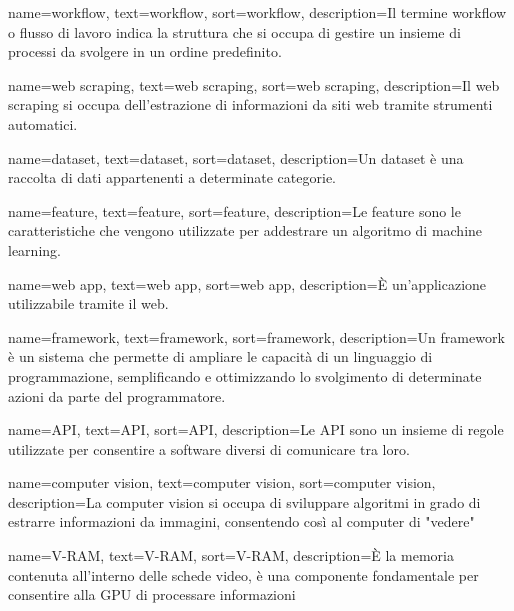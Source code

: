  {
    name=workflow,
    text=workflow,
    sort=workflow,
    description={Il termine workflow o flusso di lavoro indica la struttura che si occupa di gestire un insieme di processi da svolgere in un ordine predefinito.}
}

 {
    name=web scraping,
    text=web scraping,
    sort=web scraping,
    description={Il web scraping si occupa dell'estrazione di informazioni da siti web tramite strumenti automatici.}
}

 {
    name=dataset,
    text=dataset,
    sort=dataset,
    description={Un dataset è una raccolta di dati appartenenti a determinate categorie.}
}

 {
    name=feature,
    text=feature,
    sort=feature,
    description={Le feature sono le caratteristiche che vengono utilizzate per addestrare un algoritmo di machine learning.}
}

 {
    name=web app,
    text=web app,
    sort=web app,
    description={È un'applicazione utilizzabile tramite il web.}
}

 {
    name=framework,
    text=framework,
    sort=framework,
    description={Un framework è un sistema che permette di ampliare le capacità di un linguaggio di programmazione, semplificando e ottimizzando lo svolgimento di determinate azioni da parte del programmatore.}
}

 {
    name=API,
    text=API,
    sort=API,
    description={Le API sono un insieme di regole utilizzate per consentire a software diversi di comunicare tra loro.}
}

 {
    name=computer vision,
    text=computer vision,
    sort=computer vision,
    description={La computer vision si occupa di sviluppare algoritmi in grado di estrarre informazioni da immagini, consentendo così al computer di "vedere"}
}

 {
    name=V-RAM,
    text=V-RAM,
    sort=V-RAM,
    description={È la memoria contenuta all'interno delle schede video, è una componente fondamentale per consentire alla GPU di processare informazioni}
}

